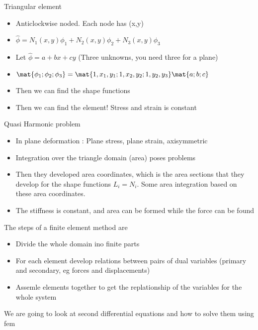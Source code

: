 	\begin{frame}{Triangular element}
		\begin{itemize}
			\item Anticlockwise noded. Each node has (x,y)
			\item $\hat{\phi} = N_1(x,y)\phi_1+N_2(x,y)\phi_2+N_3(x,y)\phi_3$
			\item Let $\hat{\phi} = a + bx + cy$ (Three unknowns, you need three for a plane)
			\item $\mat{\phi_1;\phi_2;\phi_3} = \mat{1,x_1,y_1;1,x_2,y_2;1,y_2,y_3} \mat{a;b;c}$
			\item Then we can find the shape functions
			\item Then we can find the element! Stress and strain is constant
		\end{itemize}
	\end{frame}



	\begin{frame}{Quasi Harmonic problem}
		\begin{itemize}
			\item In plane deformation : Plane stress, plane strain, axisymmetric
			\item Integration over the triangle domain (area) poses problems
			\item Then they developed area coordinates, which is the area sections that they develop for the shape functions $L_i = N_i$. Some area integration based on these area coordinates.
			\item The stiffness is constant, and area can be formed while the force can be found
			
		\end{itemize}
	\end{frame}
 


	\begin{frame}
		The steps of a finite element method are
		\begin{itemize}
			\item Divide the whole domain ino finite parts
			\item For each element develop relations between pairs of dual variables (primary and secondary, eg forces and displacements)
			\item Assemle elements together to get the replationship of the variables for the whole system	
		\end{itemize}
		We are going to look at second differential equations and how to solve them using fem
	\end{frame}


